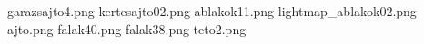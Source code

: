 garazsajto4.png
kertesajto02.png
ablakok11.png
lightmap_ablakok02.png
ajto.png
falak40.png
falak38.png
teto2.png
